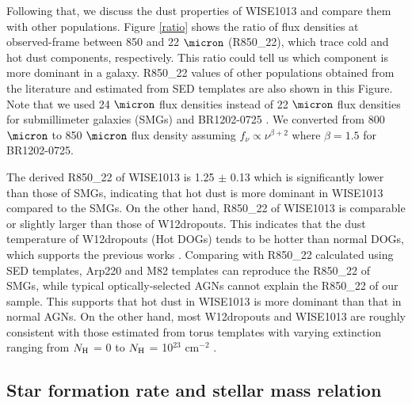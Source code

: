 \documentclass[twocolumn]{aastex6}
\begin{document}
Following that, we discuss the dust properties of WISE1013 and compare them with other populations.
Figure \ref{ratio} shows the ratio of flux densities at observed-frame between 850 and 22 $\micron$ (R850\_22), which trace cold and hot dust components, respectively.
This ratio could tell us which component is more dominant in a galaxy.
R850\_22 values of other populations obtained from the literature \citep{Magnelli,Wu,Jones_14,Jones_15,Wang,Fan_17} and estimated from SED templates \citep{Polletta,Silva} are also shown in this Figure.
Note that we used 24 $\micron$ flux densities instead of 22 $\micron$ flux densities for submillimeter galaxies (SMGs) and BR1202-0725 \citep{Leipski}.
We converted from 800 $\micron$ to 850 $\micron$ flux density assuming $f_{\nu} \propto \nu^{\beta+2}$ where $\beta = 1.5$ for BR1202-0725.
   
The derived R850\_22 of WISE1013 is 1.25 $\pm$ 0.13 which is significantly lower than those of SMGs, indicating that hot dust is more dominant in WISE1013 compared to the SMGs.
On the other hand, R850\_22 of WISE1013 is comparable or slightly larger than those of W12dropouts.
This indicates that the dust temperature of W12dropouts (Hot DOGs) tends to be hotter than normal DOGs, which supports the previous works \citep[e.g.,][]{Wu}.
Comparing with R850\_22 calculated using SED templates, Arp220 and M82 templates \citep{Polletta} can reproduce the R850\_22 of SMGs, while typical optically-selected AGNs cannot explain the R850\_22 of our sample.
This supports that hot dust in WISE1013 is more dominant than that in normal AGNs.  
On the other hand, most W12dropouts and WISE1013 are roughly consistent with those estimated from torus templates with varying extinction ranging from $N_{\rm H}$ = 0 to $N_{\rm H}$ = 10$^{23}$ cm$^{-2}$ \citep{Silva}.
   
   
\subsection{Star formation rate and stellar mass relation}
\label{M_SFR}
\end{document}
